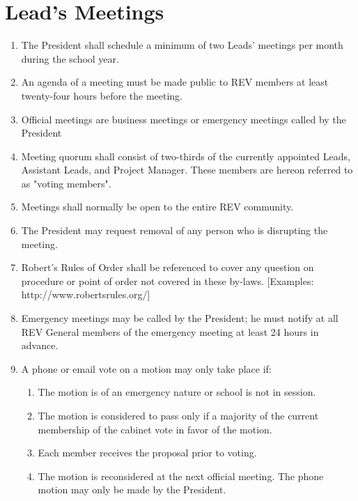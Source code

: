 \section{Lead's Meetings}
\label{leads}
\begin{enumerate}
\item The President shall schedule a minimum of two Leads’ meetings per month during the school
year. 
\item An agenda of a meeting must be made public to REV members at least twenty-four hours before
the meeting. 
\item Official meetings are business meetings or emergency meetings called by the President
\item Meeting quorum shall consist of two-thirds of the currently appointed Leads, Assistant Leads, and Project Manager. These members are hereon referred to as "voting members".
\item Meetings shall normally be open to the entire REV community. 
\item The President may request removal of any person who is disrupting the meeting. 
\item Robert's Rules of Order shall be referenced to cover any question on procedure or point of order
not covered in these by-laws. [Examples: http://www.robertsrules.org/]
\item Emergency meetings may be called by the President; he must notify at all REV General members
of the emergency meeting at least 24 hours in advance. 
\item A phone or email vote on a motion may only take place if: 
    \begin{enumerate}
    \item The motion is of an emergency nature or school is not in session. 
    \item The motion is considered to pass only if a majority of the current membership of the
cabinet vote in favor of the motion. 
    \item Each member receives the proposal prior to voting.
    \item The motion is reconsidered at the next official meeting. The phone motion may only be
made by the President.
    \end{enumerate}
\end{enumerate}